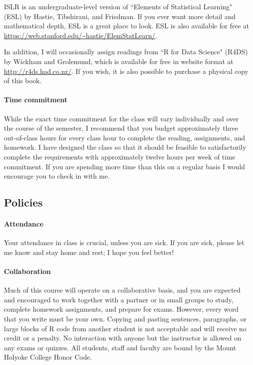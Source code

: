 \documentclass[11pt]{article}
\begin{document}
ISLR is an undergraduate-level version of ``Elements of Statistical Learning" (ESL) by Hastie, Tibshirani, and Friedman.  If you ever want more detail and mathematical depth, ESL is a great place to look.  ESL is also available for free at \url{https://web.stanford.edu/~hastie/ElemStatLearn/}.

In addition, I will occasionally assign readings from ``R for Data Science" (R4DS) by Wickham and Grolemund, which is available for free in website format at \url{http://r4ds.had.co.nz/}.  If you wish, it is also possible to purchase a physical copy of this book.

\paragraph{Time commitment}

While the exact time commitment for the class will vary individually and over the course of the semester, I recommend that you budget approximately three out-of-class hours for every class hour to complete the reading, assignments, and homework.  I have designed the class so that it should be feasible to satisfactorily complete the requirements with approximately twelve hours per week of time commitment.  If you are spending more time than this on a regular basis I would encourage you to check in with me.

\subsection*{Policies}

\paragraph{Attendance}
Your attendance in class is crucial, unless you are sick.  If you are sick, please let me know and stay home and rest; I hope you feel better!

\paragraph{Collaboration}
Much of this course will operate on a collaborative basis, and you are expected and encouraged to work together with a partner or in small groups to study, complete homework assignments, and prepare for exams. However, every word that you write must be your own. Copying and pasting sentences, paragraphs, or large blocks of R code from another student is not acceptable and will receive no credit or a penalty. No interaction with 
anyone but the instructor is allowed on any exams or quizzes.  All students, staff and faculty are bound by the Mount Holyoke College Honor Code.
\end{document}
